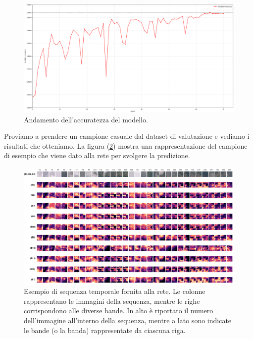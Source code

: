 \begin{figure}[H]
    \centering
    \includegraphics[width=1.02\textwidth]{Immagini/sperimentazione/UNet3D_Weight_noIgnore_accuracy_Edit_v2.png}
    \caption{Andamento dell'accuratezza del modello.}
    \label{fig:UNET_3D_withWeights_NoIgnore_accuracy}
\end{figure}

Proviamo a prendere un campione casuale dal dataset di valutazione e vediamo i risultati 
che otteniamo. La figura (\ref{fig:esempio_immagini_input}) mostra una rappresentazione 
del campione di esempio che viene dato alla rete per svolgere la predizione.

\begin{figure}[H]
    \centering
    \includegraphics[width=1.05\textwidth]{Immagini/sperimentazione/INPUT_NoIgnore_Edit.png}
    \caption{Esempio di sequenza temporale fornita alla rete. Le colonne rappresentano le 
    immagini della sequenza, mentre le righe corrispondono alle diverse bande. In alto è 
    riportato il numero dell'immagine all'interno della sequenza, mentre a lato sono 
    indicate le bande (o la banda) rappresentate da ciascuna riga.}
    \label{fig:esempio_immagini_input}
\end{figure}

